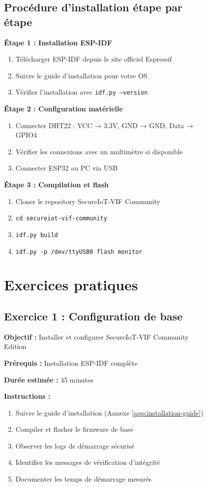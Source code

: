 \begin{figure}[h]
\begin{table}[h]
\subsection{Procédure d'installation étape par étape}

\textbf{Étape 1 : Installation ESP-IDF}
\begin{enumerate}
    \item Télécharger ESP-IDF depuis le site officiel Espressif
    \item Suivre le guide d'installation pour votre OS
    \item Vérifier l'installation avec \texttt{idf.py --version}
\end{enumerate}

\textbf{Étape 2 : Configuration matérielle}
\begin{enumerate}
    \item Connecter DHT22 : VCC → 3.3V, GND → GND, Data → GPIO4
    \item Vérifier les connexions avec un multimètre si disponible
    \item Connecter ESP32 au PC via USB
\end{enumerate}

\textbf{Étape 3 : Compilation et flash}
\begin{enumerate}
    \item Cloner le repository SecureIoT-VIF Community
    \item \texttt{cd secureiot-vif-community}
    \item \texttt{idf.py build}
    \item \texttt{idf.py -p /dev/ttyUSB0 flash monitor}
\end{enumerate}

\section{Exercices pratiques}
\label{app:exercises}

\subsection{Exercice 1 : Configuration de base}

\textbf{Objectif :} Installer et configurer SecureIoT-VIF Community Edition

\textbf{Prérequis :} Installation ESP-IDF complète

\textbf{Durée estimée :} 45 minutes

\textbf{Instructions :}
\begin{enumerate}
    \item Suivre le guide d'installation (Annexe \ref{app:installation-guide})
    \item Compiler et flasher le firmware de base
    \item Observer les logs de démarrage sécurisé
    \item Identifier les messages de vérification d'intégrité
    \item Documenter les temps de démarrage mesurés
\end{enumerate}


\end{table}
\end{figure}
